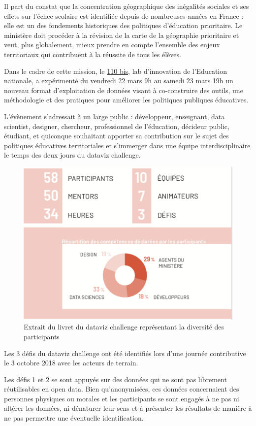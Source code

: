 \documentclass[]{book}
\begin{document}
Il part du constat que la concentration géographique des inégalités
sociales et ses effets sur l'échec scolaire est identifiée depuis de
nombreuses années en France : elle est un des fondements historiques des
politiques d'éducation prioritaire. Le ministère doit procéder à la
révision de la carte de la géographie prioritaire et veut, plus
globalement, mieux prendre en compte l'ensemble des enjeux territoriaux
qui contribuent à la réussite de tous les élèves.

Dans le cadre de cette mission, le
\href{https://www.education.gouv.fr/110bislab/cid130754/presentation-du-110-bis-lab-d-innovation-de-l-education-nationale.html}{110
bis}, lab d'innovation de l'Education nationale, a expérimenté du
vendredi 22 mars 9h au samedi 23 mars 19h un nouveau format
d'exploitation de données visant à co-construire des outils, une
méthodologie et des pratiques pour améliorer les politiques publiques
éducatives.

L'évènement s'adressait à un large public : développeur, enseignant,
data scientist, designer, chercheur, professionnel de l'éducation,
décideur public, étudiant, et quiconque souhaitant apporter sa
contribution sur le sujet des politiques éducatives territoriales et
s'immerger dans une équipe interdisciplinaire le temps des deux jours du
dataviz challenge.

\begin{figure}

{\centering \includegraphics[width=0.5\linewidth]{./img/participants} 

}

\caption{Extrait du livret du dataviz challenge représentant la diversité des participants}\label{fig:unnamed-chunk-1}
\end{figure}

Les 3 défis du dataviz challenge ont été identifiés lors d'une journée
contributive le 3 octobre 2018 avec les acteurs de terrain.

Les défis 1 et 2 se sont appuyés sur des données qui ne sont pas
librement réutilisables en open data. Bien qu'anonymisées, ces données
concernaient des personnes physiques ou morales et les participants se
sont engagés à ne pas ni altérer les données, ni dénaturer leur sens et
à présenter les résultats de manière à ne pas permettre une éventuelle
identification.
\end{document}
